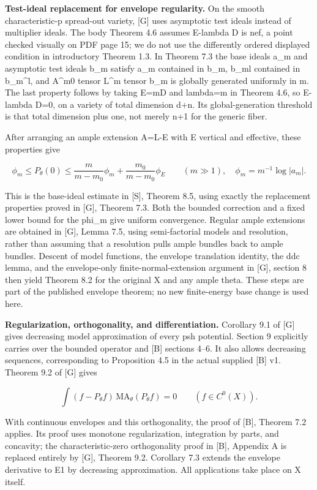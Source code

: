 \documentclass[11pt]{article}
\begin{document}
\textbf{Test-ideal replacement for envelope regularity.} On the smooth characteristic-p spread-out variety, [G] uses asymptotic test ideals instead of multiplier ideals. The body Theorem 4.6 assumes E-lambda D is nef, a point checked visually on PDF page 15; we do not use the differently ordered displayed condition in introductory Theorem 1.3. In Theorem 7.3 the base ideals a\_m and asymptotic test ideals b\_m satisfy a\_m contained in b\_m, b\_ml contained in b\_m\textasciicircum{}l, and A\textasciicircum{}m0 tensor L\textasciicircum{}m tensor b\_m is globally generated uniformly in m. The last property follows by taking E=mD and lambda=m in Theorem 4.6, so E-lambda D=0, on a variety of total dimension d+n. Its global-generation threshold is that total dimension plus one, not merely n+1 for the generic fiber.

After arranging an ample extension A=L-E with E vertical and effective, these properties give

\[
\phi_m\leq P_\theta(0)\leq\frac{m}{m-m_0}\phi_m+
\frac{m_0}{m-m_0}\phi_E\qquad(m\gg1),
\quad \phi_m=m^{-1}\log|a_m|.
\]

This is the base-ideal estimate in [S], Theorem 8.5, using exactly the replacement properties proved in [G], Theorem 7.3. Both the bounded correction and a fixed lower bound for the phi\_m give uniform convergence. Regular ample extensions are obtained in [G], Lemma 7.5, using semi-factorial models and resolution, rather than assuming that a resolution pulls ample bundles back to ample bundles. Descent of model functions, the envelope translation identity, the ddc lemma, and the envelope-only finite-normal-extension argument in [G], section 8 then yield Theorem 8.2 for the original X and any ample theta. These steps are part of the published envelope theorem; no new finite-energy base change is used here.

\textbf{Regularization, orthogonality, and differentiation.} Corollary 9.1 of [G] gives decreasing model approximation of every psh potential. Section 9 explicitly carries over the bounded operator and [B] sections 4--6. It also allows decreasing sequences, corresponding to Proposition 4.5 in the actual supplied [B] v1. Theorem 9.2 of [G] gives

\[
\int (f-P_\theta f)\,\mathrm{MA}_\theta(P_\theta f)=0\qquad(f\in C^0(X)).
\]

With continuous envelopes and this orthogonality, the proof of [B], Theorem 7.2 applies. Its proof uses monotone regularization, integration by parts, and concavity; the characteristic-zero orthogonality proof in [B], Appendix A is replaced entirely by [G], Theorem 9.2. Corollary 7.3 extends the envelope derivative to E1 by decreasing approximation. All applications take place on X itself.
\end{document}
